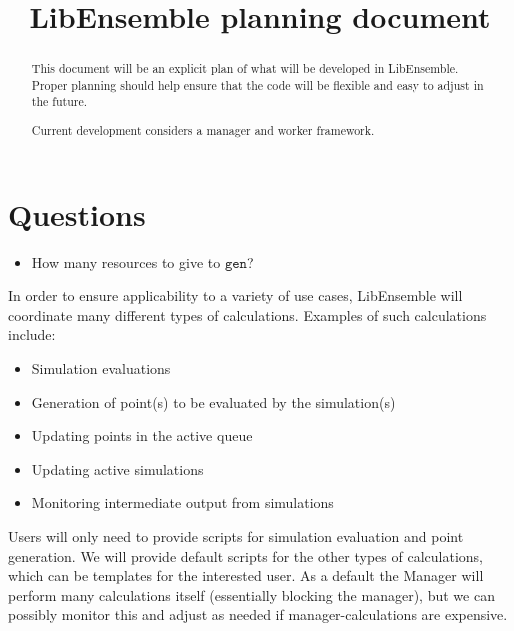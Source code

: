 \documentclass{article}
\title{LibEnsemble planning document}
\begin{document}
\maketitle
\begin{abstract}
  This document will be an explicit plan of what will be developed in
  LibEnsemble. Proper planning should help ensure that the code will be flexible
  and easy to adjust in the future.

  Current development considers a manager and worker framework. 
\end{abstract}
\section{Questions}
\begin{itemize}
  \item How many resources to give to $\mathtt{gen}$?
\end{itemize}

In order to ensure applicability to a variety of use cases, 
LibEnsemble will coordinate many different types of calculations. Examples of
such calculations include:
\begin{itemize}
  \item Simulation evaluations
  \item Generation of point(s) to be evaluated by the simulation(s)
  \item Updating points in the active queue
  \item Updating active simulations
  \item Monitoring intermediate output from simulations
\end{itemize}
Users will only need to provide scripts for simulation evaluation and point
generation. We will provide default scripts for the other types of calculations, 
which can be templates for the interested user. As a default the Manager will
perform many calculations itself (essentially blocking the manager), but we can
possibly monitor this and adjust as needed if manager-calculations are
expensive. 
\end{document}
